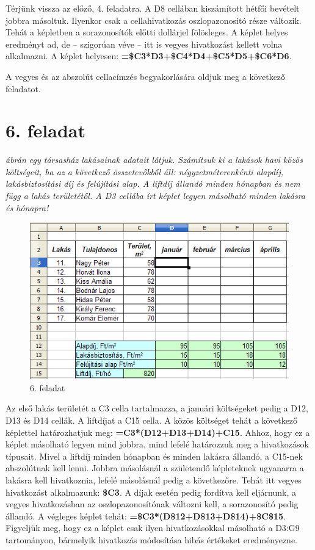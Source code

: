 Térjünk vissza az előző, 4. feladatra. A D8 cellában
kiszámított hétfői bevételt jobbra másoltuk. Ilyenkor
csak a cellahivatkozás oszlopazonosító része változik.
Tehát a képletben a sorazonosítók előtti dollárjel
fölösleges. A képlet helyes eredményt ad, de --  szigorúan
véve --  itt is vegyes hivatkozást kellett volna alkalmazni. A
képlet helyesen:
\textsf{\textbf{=\$C3*D3+\$C4*D4+\$C5*D5+\$C6*D6}}.

A vegyes és az abszolút cellacímzés begyakorlására oldjuk
meg a következő feladatot.

\section{6. feladat}
{\itshape
{} ábrán egy társasház lakásainak adatait látjuk.
Számítsuk ki a lakások havi közös költségeit, ha az a
következő összetevőkből áll:
négyzetméterenkénti alapdíj, lakásbiztosítási díj és
felújítási alap. A liftdíj állandó minden hónapban és
nem függ a lakás területétől. A D3 cellába írt képlet
legyen másolható minden lakásra és hónapra!}

\begin{figure}[!h]
\begin{center}
\includegraphics[width=12.813cm]{oocalcv2-img30.png}
\caption{6. feladat}\label{6-feladat}
\end{center}
\end{figure}

Az első lakás területét a C3 cella tartalmazza, a januári
költségeket pedig a D12, D13 és D14 cellák. A liftdíjat a C15
cella. A közös költséget tehát a következő képlettel
határozhatjuk meg:
\textsf{\textbf{=C3*(D12+D13+D14)+C15}}. Ahhoz, hogy
ez a képlet másolható legyen mind jobbra, mind lefelé
határozzuk meg a hivatkozások típusait. Mivel a liftdíj minden
hónapban és minden lakásra állandó,  a C15-nek abszolútnak
kell lenni. Jobbra másolásnál a születendő képleteknek
ugyanarra a lakásra  kell hivatkoznia, lefelé másolásnál
pedig a következőre. Tehát itt vegyes hivatkozást
alkalmazunk: \textsf{\textbf{\$C3}}. A díjak
esetén pedig fordítva kell eljárnunk, a vegyes hivatkozásban az
oszlopazonosítónak változni kell, a sorazonosító pedig
állandó. A végleges képlet tehát:
\textsf{\textbf{=\$C3*(D\$12+D\$13+D\$14)+\$C\$15}}. 
Figyeljük meg, hogy ez a képlet csak ilyen
hivatkozásokkal másolható a D3:G9 tartományon, bármelyik
hivatkozás módosítása hibás értékeket eredményezne.

